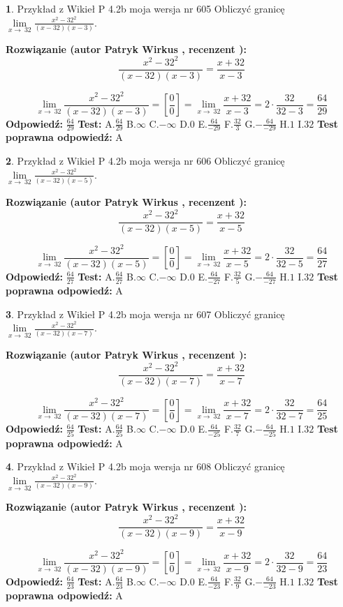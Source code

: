 \documentclass[12pt, a4paper]{article}
\theoremstyle{definition} %
\newtheorem{zad}{}
\newcommand{\zadStart}[1]{\begin{zad}#1\newline}
\newcommand{\zadStop}{\end{zad}}
\newcommand{\rozwStart}[2]{\noindent \textbf{Rozwiązanie (autor #1 , recenzent #2): }\newline}
\newcommand{\rozwStop}{\newline}
\newcommand{\odpStart}{\noindent \textbf{Odpowiedź:}\newline}
\newcommand{\odpStop}{\newline}
\newcommand{\testStart}{\noindent \textbf{Test:}\newline}
\newcommand{\testStop}{\newline}
\newcommand{\kluczStart}{\noindent \textbf{Test poprawna odpowiedź:}\newline}
\newcommand{\kluczStop}{\newline}
\begin{document}
\zadStart{Przykład z Wikieł P 4.2b moja wersja nr 605}
Obliczyć granicę $\lim\limits_{x\to\ 32}\frac{x^{2}-32^{2}}{(x-32)(x-3)}$.
\zadStop
\rozwStart{Patryk Wirkus}{}
$$\frac{x^{2}-32^{2}}{(x-32)(x-3)}=\frac{x+32}{x-3}$$

$$\lim\limits_{x\to\ 32}\frac{x^{2}-32^{2}}{(x-32)(x-3)}=[\frac{0}{0}]=\lim\limits_{x\to\ 32}\frac{x+32}{x-3}=2 \cdot \frac{32}{32-3} = \frac{64}{29}$$
\rozwStop
\odpStart
$\frac{64}{29}$
\odpStop
\testStart
A.$\frac{64}{29}$
B.$\infty$
C.$-\infty$
D.$0$
E.$\frac{64}{-29}$
F.$\frac{32}{3}$
G.$-\frac{64}{-29}$
H.$1$
I.$32$
\testStop
\kluczStart
A
\kluczStop



\zadStart{Przykład z Wikieł P 4.2b moja wersja nr 606}
Obliczyć granicę $\lim\limits_{x\to\ 32}\frac{x^{2}-32^{2}}{(x-32)(x-5)}$.
\zadStop
\rozwStart{Patryk Wirkus}{}
$$\frac{x^{2}-32^{2}}{(x-32)(x-5)}=\frac{x+32}{x-5}$$

$$\lim\limits_{x\to\ 32}\frac{x^{2}-32^{2}}{(x-32)(x-5)}=[\frac{0}{0}]=\lim\limits_{x\to\ 32}\frac{x+32}{x-5}=2 \cdot \frac{32}{32-5} = \frac{64}{27}$$
\rozwStop
\odpStart
$\frac{64}{27}$
\odpStop
\testStart
A.$\frac{64}{27}$
B.$\infty$
C.$-\infty$
D.$0$
E.$\frac{64}{-27}$
F.$\frac{32}{5}$
G.$-\frac{64}{-27}$
H.$1$
I.$32$
\testStop
\kluczStart
A
\kluczStop



\zadStart{Przykład z Wikieł P 4.2b moja wersja nr 607}
Obliczyć granicę $\lim\limits_{x\to\ 32}\frac{x^{2}-32^{2}}{(x-32)(x-7)}$.
\zadStop
\rozwStart{Patryk Wirkus}{}
$$\frac{x^{2}-32^{2}}{(x-32)(x-7)}=\frac{x+32}{x-7}$$

$$\lim\limits_{x\to\ 32}\frac{x^{2}-32^{2}}{(x-32)(x-7)}=[\frac{0}{0}]=\lim\limits_{x\to\ 32}\frac{x+32}{x-7}=2 \cdot \frac{32}{32-7} = \frac{64}{25}$$
\rozwStop
\odpStart
$\frac{64}{25}$
\odpStop
\testStart
A.$\frac{64}{25}$
B.$\infty$
C.$-\infty$
D.$0$
E.$\frac{64}{-25}$
F.$\frac{32}{7}$
G.$-\frac{64}{-25}$
H.$1$
I.$32$
\testStop
\kluczStart
A
\kluczStop



\zadStart{Przykład z Wikieł P 4.2b moja wersja nr 608}
Obliczyć granicę $\lim\limits_{x\to\ 32}\frac{x^{2}-32^{2}}{(x-32)(x-9)}$.
\zadStop
\rozwStart{Patryk Wirkus}{}
$$\frac{x^{2}-32^{2}}{(x-32)(x-9)}=\frac{x+32}{x-9}$$

$$\lim\limits_{x\to\ 32}\frac{x^{2}-32^{2}}{(x-32)(x-9)}=[\frac{0}{0}]=\lim\limits_{x\to\ 32}\frac{x+32}{x-9}=2 \cdot \frac{32}{32-9} = \frac{64}{23}$$
\rozwStop
\odpStart
$\frac{64}{23}$
\odpStop
\testStart
A.$\frac{64}{23}$
B.$\infty$
C.$-\infty$
D.$0$
E.$\frac{64}{-23}$
F.$\frac{32}{9}$
G.$-\frac{64}{-23}$
H.$1$
I.$32$
\testStop
\kluczStart
A
\kluczStop
\end{document}
